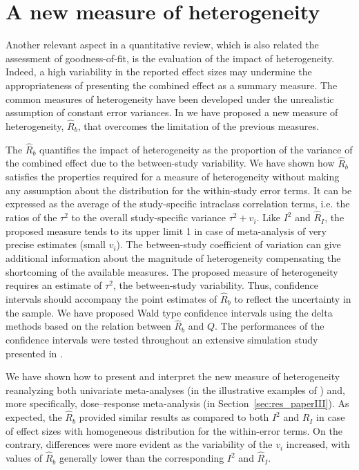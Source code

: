\documentclass[11pt,a4paper,twoside,openany]{book}\usepackage{knitr}
\begin{document}
{\section{A new measure of heterogeneity}

Another relevant aspect in a quantitative review, which is also related the assessment of goodness-of-fit, is the evaluation of the impact of heterogeneity. Indeed, a high variability in the reported effect sizes may undermine the appropriateness of presenting the combined effect as a summary measure. The common measures of heterogeneity have been developed under the unrealistic assumption of constant error variances. In  we have proposed a new measure of heterogeneity, $\hat R_b$, that overcomes the limitation of the previous measures.

The $\hat R_b$ quantifies the impact of heterogeneity as the proportion of the variance of the combined effect due to the between-study variability. We have shown how $\hat R_b$ satisfies the properties required for a measure of heterogeneity without making any assumption about the distribution for the within-study error terms. It can be expressed as the average of the study-specific intraclass correlation terms, i.e. the ratios of the $\tau^2$ to the overall study-specific variance $\tau^2 + v_i$. Like $I^2$ and $\hat R_I$, the proposed measure tends to its upper limit 1 in case of meta-analysis of very precise estimates (small $v_i$). The between-study coefficient of variation can give additional information about the magnitude of heterogeneity compensating the shortcoming of the available measures.
The proposed measure of heterogeneity requires an estimate of $\tau^2$, the between-study variability. Thus, confidence intervals should accompany the point estimates of $\hat R_b$ to reflect the uncertainty in the sample. We have proposed Wald type confidence intervals using the delta methods based on the relation between $\hat R_b$ and $Q$. The performances of the confidence intervals were tested throughout an extensive simulation study presented in .

We have shown how to present and interpret the new measure of heterogeneity reanalyzing both univariate meta-analyses (in the illustrative examples of ) and, more specifically, dose--response meta-analysis (in Section~\ref{sec:res_paperIII}). As expected, the $\hat R_b$ provided similar results as compared to both $I^2$ and $\hat R_I$ in case of effect sizes with homogeneous distribution for the within-error terms. On the contrary, differences were more evident as the variability of the $v_i$ increased, with values of $\hat R_b$ generally lower than the corresponding $I^2$ and $\hat R_I$.


}
\end{document}
